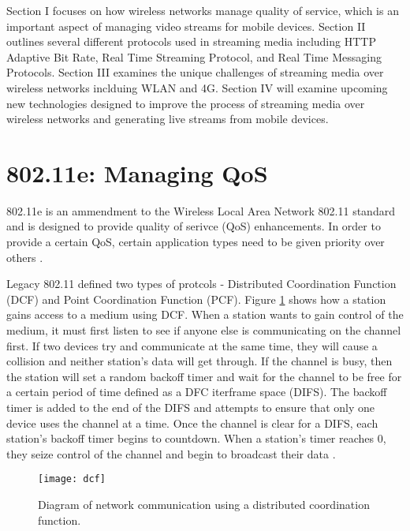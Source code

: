 \documentclass[12pt]{article}
\begin{document}
Section I focuses on how wireless networks manage quality of service, which is an important aspect of managing video streams for mobile devices.  Section II outlines several different protocols used in streaming media including HTTP Adaptive Bit Rate, Real Time Streaming Protocol, and Real Time Messaging Protocols.  Section III examines the unique challenges of streaming media over wireless networks inclduing WLAN and 4G.  Section IV will examine upcoming new technologies designed to improve the process of streaming media over wireless networks and generating live streams from mobile devices.

\section{802.11e: Managing QoS}
802.11e is an ammendment to the Wireless Local Area Network 802.11 standard and is designed to provide quality of serivce (QoS) enhancements.  In order to provide a certain QoS, certain application types need to be given priority over others \cite{Thottan:2006:IEM:1234161.1234187}.

Legacy 802.11 defined two types of protcols - Distributed Coordination Function (DCF) and Point Coordination Function (PCF).  Figure \ref{fig:dcf} shows how a station gains access to a medium using DCF.  When a station wants to gain control of the medium, it must first listen to see if anyone else is communicating on the channel first.  If two devices try and communicate at the same time, they will cause a collision and neither station's data will get through. If the channel is busy, then the station will set a random backoff timer and wait for the channel to be free for a certain period of time defined as a DFC iterframe space (DIFS).  The backoff timer is added to the end of the DIFS and attempts to ensure that only one device uses the channel at a time.  Once the channel is clear for a DIFS, each station's backoff timer begins to countdown.  When a station's timer reaches 0, they seize control of the channel and begin to broadcast their data \cite{Thottan:2006:IEM:1234161.1234187}.

\begin{figure}[htb]
  \begin{center}
    \texttt{[image: dcf]}
    \caption{Diagram of network communication using a distributed coordination function.}
    \label{fig:dcf}
  \end{center}
\end{figure}
\end{document}
